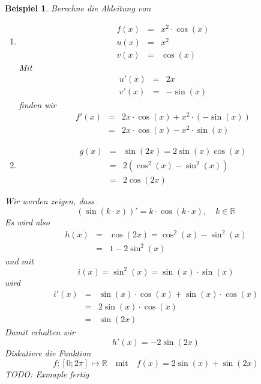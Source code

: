 \documentclass{report}
\newtheorem{myexample}{Beispiel}
\begin{document}
\begin{myexample}Berechne die Ableitung von
\begin{enumerate}
\item \begin{eqnarray}f(x) & = & x^2 \cdot \cos(x) \\
u(x) & = & x^2 \\
v(x) & = & \cos(x)\end{eqnarray}
Mit
\begin{eqnarray}u'(x) & = & 2x \nonumber \\
v'(x) & = & -\sin(x)\end{eqnarray}
finden wir
\begin{eqnarray}f'(x) & = & 2x \cdot \cos(x) + x^2 \cdot (-\sin(x)) \nonumber \\
& = & 2x \cdot \cos(x) - x^2 \cdot \sin(x)\end{eqnarray}
\item \begin{eqnarray}g(x) & = & \sin(2x) = 2 \sin(x) \cos(x) \nonumber \\
& = & 2(\cos^2(x) - \sin^2(x)) \nonumber \\
& = & 2 \cos(2x)\end{eqnarray}
\end{enumerate}
Wir werden zeigen, dass
\begin{equation}(\sin(k \cdot x))' = k \cdot \cos(k \cdot x), \quad k \in \mathbb{R}\end{equation}
Es wird also
\begin{eqnarray}h(x) & = & \cos(2x) = \cos^2(x) - \sin^2(x) \nonumber \\
& = & 1 - 2 \sin^2(x)\end{eqnarray}
und mit
\begin{equation}i(x) = \sin^2(x) = \sin(x) \cdot \sin(x)\end{equation}
wird
\begin{eqnarray}i'(x) & = & \sin(x) \cdot \cos(x) + \sin(x) \cdot \cos(x) \nonumber \\
& = & 2 \sin(x) \cdot \cos(x) \nonumber \\
& = & \sin(2x)\end{eqnarray}
Damit erhalten wir
\begin{equation}h'(x) = -2 \sin(2x)\end{equation}
Diskutiere die Funktion
\begin{equation}f: [0; 2 \pi ] \mapsto \mathbb{R} \quad \mbox{mit} \quad f(x) = 2 \sin(x) + \sin(2x)\end{equation}
TODO: Exmaple fertig
\end{myexample}
\end{document}
